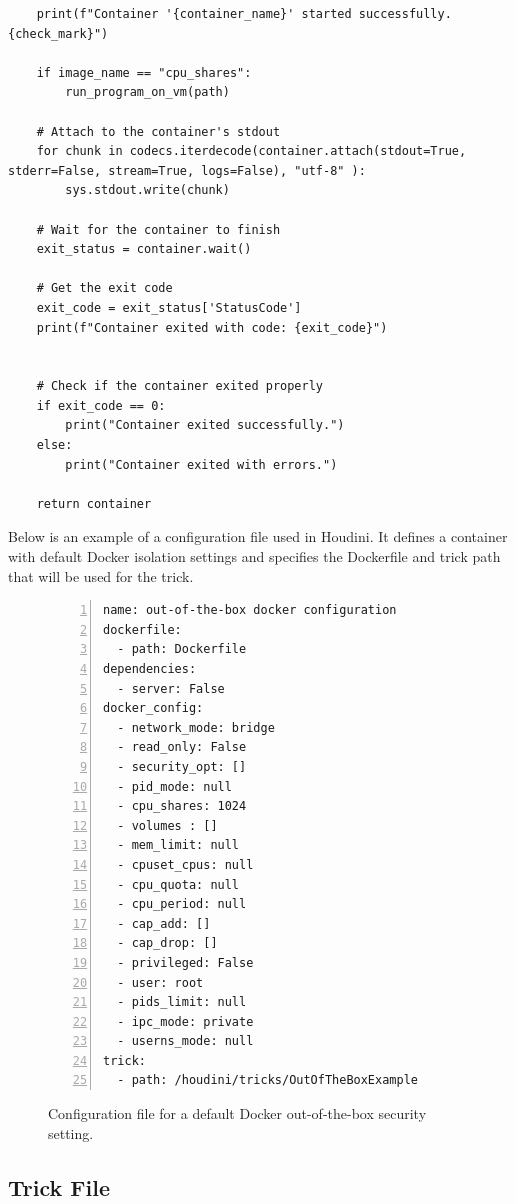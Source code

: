 \documentclass[12pt]{report}
\begin{document}
\begin{doublespace}
\begin{lstlisting}
    print(f"Container '{container_name}' started successfully. {check_mark}")

    if image_name == "cpu_shares":
        run_program_on_vm(path)

    # Attach to the container's stdout
    for chunk in codecs.iterdecode(container.attach(stdout=True, stderr=False, stream=True, logs=False), "utf-8" ):
        sys.stdout.write(chunk)

    # Wait for the container to finish
    exit_status = container.wait()
    
    # Get the exit code
    exit_code = exit_status['StatusCode']
    print(f"Container exited with code: {exit_code}")
    

    # Check if the container exited properly
    if exit_code == 0:
        print("Container exited successfully.")
    else:
        print("Container exited with errors.")

    return container
\end{lstlisting}


Below is an example of a configuration file used in Houdini. It defines a container with default Docker isolation settings and specifies the Dockerfile and trick path that will be used for the trick.

\begin{figure}[H]
\caption{Configuration file for a default Docker out-of-the-box security setting.}
\label{fig:configuration-file}
\begin{lstlisting}[caption={}, numbers=left, numberstyle=\tiny, stepnumber=1, breaklines=true, frame=single, backgroundcolor=\color{gray!10}, basicstyle=\ttfamily\scriptsize, showspaces=false, showstringspaces=false]
name: out-of-the-box docker configuration
dockerfile:
  - path: Dockerfile
dependencies:
  - server: False
docker_config: 
  - network_mode: bridge
  - read_only: False
  - security_opt: []
  - pid_mode: null
  - cpu_shares: 1024
  - volumes : []
  - mem_limit: null
  - cpuset_cpus: null
  - cpu_quota: null
  - cpu_period: null
  - cap_add: []
  - cap_drop: []
  - privileged: False
  - user: root
  - pids_limit: null
  - ipc_mode: private
  - userns_mode: null
trick:
  - path: /houdini/tricks/OutOfTheBoxExample
\end{lstlisting}
\end{figure}




\subsection{Trick File}
\label{sec:trick_file}


\end{doublespace}
\end{document}

